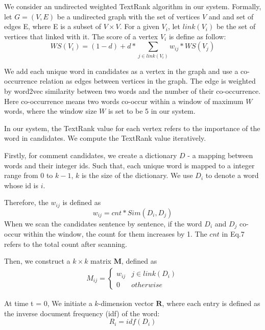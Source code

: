 \documentclass{llncs}
\begin{document}
We consider an undirected weighted TextRank algorithm in our system. 
Formally, let $G = (V, E)$ be a undirected graph with the set of vertices $V$ and 
and set of edges E, where E is a subset of $V \times V$. For a given $V_i$, let 
$link(V_i)$ be the set of vertices that linked with it. The score of a vertex 
$V_i$ is define as follow:
\begin{equation}
  WS(V_i) = (1 - d) + d * \sum_{j \in link(V_i)}{w_{ij} * WS(V_j)}
\end{equation}

We add each unique word in candidates as a vertex in the graph and use a 
co-occurrence relation as edges between vertices in the graph. The edge is 
weighted by word2vec similarity between two words and the number of their 
co-occurrence. Here co-occurrence means two words co-occur within a window of 
maximum $W$ words, where the window size $W$ is set to be 5 in our system.

In our system, the TextRank value for each vertex refers to the importance of 
the word in candidates. We compute the TextRank value iteratively.

Firstly, for comment candidates, we create a dictionary $D$ - a mapping between words 
and their integer ids. Such that, each unique word is mapped to a integer range 
from $0$ to $k-1$, $k$ is the size of the dictionary. We use $D_i$ to denote a 
word whose id is $i$.

Therefore, the $w_{ij}$ is defined as
\begin{equation}
  w_{ij} = cnt * Sim(D_i, D_j)
\end{equation}
When we scan the candidates sentence by sentence, if the word $D_i$ and $D_j$ 
co-occur within the window, the count for them increases by 1. The $cnt$ in Eq.7 
refers to the total count after scanning.

Then, we construct a $k \times k$ matrix $\bm{M}$, defined as
\begin{equation}
  \begin{aligned}
    M_{ij} = \begin{cases} 
             w_{ij} & j \in link(D_i) \\
             0 & otherwise
             \end{cases}
  \end{aligned}
\end{equation}

At time t = 0, We initiate a $k$-dimension vector $\bm{R}$, where each entry is defined as the inverse document frequency (idf) of the word: 
\begin{equation}
  R_i = idf(D_i)
\end{equation}
\end{document}
